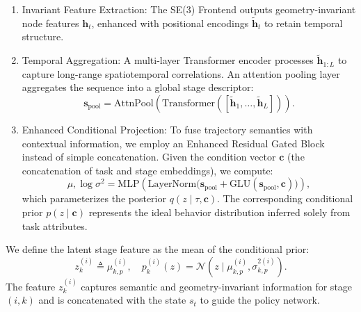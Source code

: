 \documentclass{article}
\begin{document}
\begin{enumerate}
    \item Invariant Feature Extraction: The SE(3) Frontend outputs geometry-invariant node features $\mathbf{h}_t$, enhanced with positional encodings $\tilde{\mathbf{h}}_t$ to retain temporal structure.
    
    \item Temporal Aggregation: A multi-layer Transformer encoder processes $\tilde{\mathbf{h}}_{1:L}$ to capture long-range spatiotemporal correlations. 
    An attention pooling layer aggregates the sequence into a global stage descriptor:
    \begin{equation*}
    \mathbf{s}_{\mathrm{pool}} = \mathrm{AttnPool}\!\left(\mathrm{Transformer}\!\left([\tilde{\mathbf{h}}_1, \ldots, \tilde{\mathbf{h}}_L]\right)\right).
    \end{equation*}

    \item Enhanced Conditional Projection: To fuse trajectory semantics with contextual information, we employ an Enhanced Residual Gated Block instead of simple concatenation. 
    Given the condition vector $\mathbf{c}$ (the concatenation of task and stage embeddings), we compute:
    \begin{equation*}
    \mu, \log\sigma^2 = \mathrm{MLP}\!\left(\mathrm{LayerNorm}\!\big(\mathbf{s}_{\mathrm{pool}} + \mathrm{GLU}(\mathbf{s}_{\mathrm{pool}}, \mathbf{c})\big)\right),
    \end{equation*}
    which parameterizes the posterior $q(z \mid \tau, \mathbf{c})$. 
    The corresponding conditional prior $p(z \mid \mathbf{c})$ represents the ideal behavior distribution inferred solely from task attributes.
\end{enumerate}

We define the latent stage feature as the mean of the conditional prior:
\begin{equation*}
z^{(i)}_{k} \triangleq \mu^{(i)}_{k,p}, \quad p^{(i)}_{k}(z) = \mathcal{N}\!\left(z \mid \mu^{(i)}_{k,p}, \sigma^{2 (i)}_{k,p}\right).
\end{equation*}
The feature $z^{(i)}_{k}$ captures semantic and geometry-invariant information for stage $(i,k)$ and is concatenated with the state $s_t$ to guide the policy network.

\end{document}

